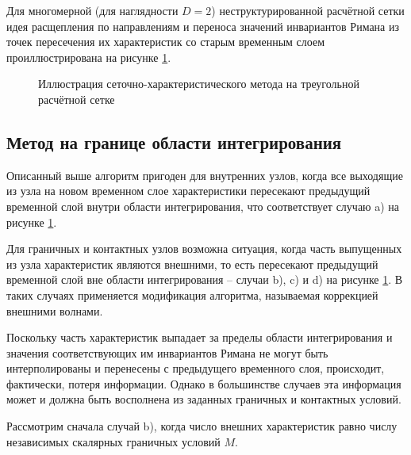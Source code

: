 Для многомерной (для наглядности $D = 2$) неструктурированной расчётной сетки 
идея расщепления по направлениям и переноса значений инвариантов Римана 
из точек пересечения их характеристик со старым временным слоем 
проиллюстрирована на рисунке \ref{pic:gcm-on-triangles}.
\begin{figure}[H]
	\caption{Иллюстрация сеточно-характеристического метода на треугольной расчётной сетке}
	\label{pic:gcm-on-triangles}
\end{figure}


\subsection{Метод на границе области интегрирования}
Описанный выше алгоритм пригоден для внутренних узлов, когда все выходящие 
из узла на новом временном слое характеристики пересекают предыдущий временной слой 
внутри области интегрирования, что соответствует случаю a) на рисунке \ref{pic:gcm-on-triangles}.

Для граничных и контактных узлов возможна ситуация, 
когда часть выпущенных из узла характеристик являются внешними, то есть
пересекают предыдущий временной слой вне области интегрирования -- 
случаи b), c) и d) на рисунке \ref{pic:gcm-on-triangles}. 
В таких случаях применяется модификация алгоритма, 
называемая коррекцией внешними волнами. 

Поскольку часть характеристик выпадает за пределы области интегрирования 
и значения соответствующих им инвариантов Римана не могут быть интерполированы
и перенесены с предыдущего временного слоя, происходит, фактически, потеря информации. 
Однако в большинстве случаев эта информация может и должна быть восполнена
из заданных граничных и контактных условий.

Рассмотрим сначала случай b), когда число внешних характеристик 
равно числу независимых скалярных граничных условий $M$.


